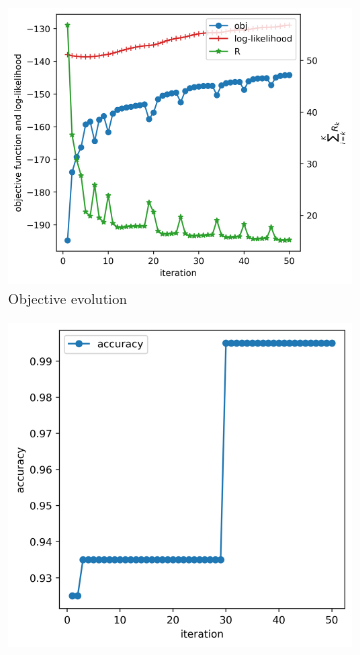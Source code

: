 \documentclass[10pt,journal,compsoc]{IEEEtran}
\begin{document}
    \begin{figure}[!t]
        \begin{subfigure}{.23\textwidth}
            \centering
            \vspace{1ex}
            \includegraphics[width=1.15\linewidth]{figures/loss.png}  
            \caption{\vspace{1ex}Objective evolution}
            \label{fig:loss}
        \end{subfigure}
        \hspace{5ex}
        \begin{subfigure}{.23\textwidth}
            \centering
            \vspace{1ex}
            \includegraphics[width=\linewidth]{figures/acc.png}  

\end{subfigure}
\end{figure}
\end{document}
